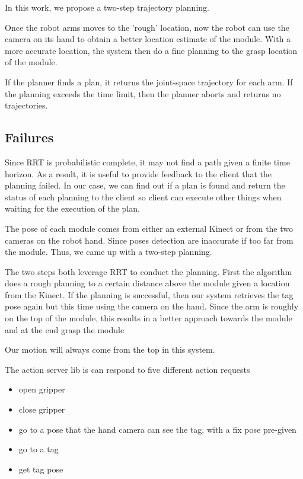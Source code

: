 In this work, we propose a two-step trajectory planning. 

Once the robot arms moves to the 'rough' location, now the robot can use the camera on its hand to obtain a better location estimate of the module.  With a more accurate location, the system then do a fine planning to the grasp location of the module. 

If the planner finds a plan, it returns the joint-space trajectory for each arm. If the planning exceeds the time limit, then the planner aborts and returns no trajectories. 

\subsection{Failures}
Since RRT is probabilistic complete, it may not find a path given a finite time horizon. As a result, it is useful to provide feedback to the client that the planning failed. In our case, we can find out if a plan is found and return the status of each planning to the client so client can execute other things when waiting for the execution of the plan. 


The pose of each module comes from either an external Kinect or from the two cameras on the robot hand. Since poses detection are inaccurate if too far from the module. Thus, we came up with a two-step planning.


The two steps both leverage RRT to conduct the planning. First the algorithm does a rough planning to a certain distance above the module given a location from the Kinect. If the planning is successful, then our system retrieves the tag pose again but this time using the camera on the hand. Since the arm is roughly on the top of the module, this results in a better approach towards the module and at the end grasp the module





Our motion will always come from the top in this system. 


The action server lib is can respond to five different action requests
\begin{itemize}
\item open gripper
\item close gripper
\item go to a pose that the hand camera can see the tag, with a fix pose pre-given
\item go to a tag
\item get tag pose
\end{itemize}

